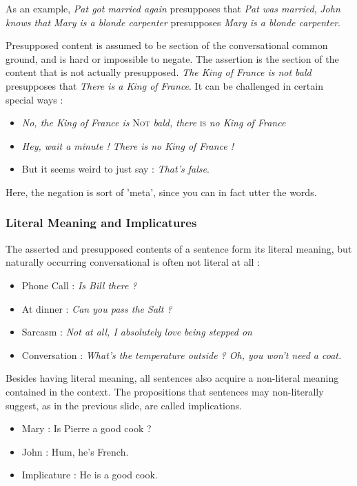 \documentclass{cours}
\begin{document}
As an example, \textsl{Pat got married again} presupposes that \textsl{Pat was married}, \textsl{John knows that Mary is a blonde carpenter} presupposes \textsl{Mary is a blonde carpenter}.

Presupposed content is assumed to be section of the conversational common ground, and is hard or impossible to negate. The assertion is the section of the content that is not actually presupposed. \textsl{The King of France is not bald} presupposes that \textsl{There is a King of France}. It can be challenged in certain special ways\! :
\begin{itemize}
    \item \textsl{No, the King of France is} \textsc{Not} \textsl{bald, there} \textsc{is} \textsl{no King of France}
    \item \textsl{Hey, wait a minute ! There is no King of France !}
    \item But it seems weird to just say\! : \textsl{That's false}.
\end{itemize}
Here, the negation is sort of 'meta', since you can in fact utter the words.

\subsubsection{Literal Meaning and Implicatures}
The asserted and presupposed contents of a sentence form its literal meaning, but naturally occurring conversational is often not literal at all\! :
\begin{itemize}
    \item Phone Call\! : \textsl{Is Bill there ? }
    \item At dinner\! : \textsl{Can you pass the Salt ?}
    \item Sarcasm\! : \textsl{Not at all, I absolutely} \emph{love} \textsl{being stepped on}
    \item Conversation\! : \textsl{What's the temperature outside ? Oh, you won't need a coat.}
\end{itemize}
Besides having literal meaning, all sentences also acquire a non-literal meaning contained in the context. The propositions that sentences may non-literally suggest, as in the previous slide, are called implications.

\begin{itemize}
    \item Mary\! : Is Pierre a good cook ?
    \item John\! : Hum, he's French.
    \item Implicature\! : He is a good cook.
\end{itemize}
\end{document}
